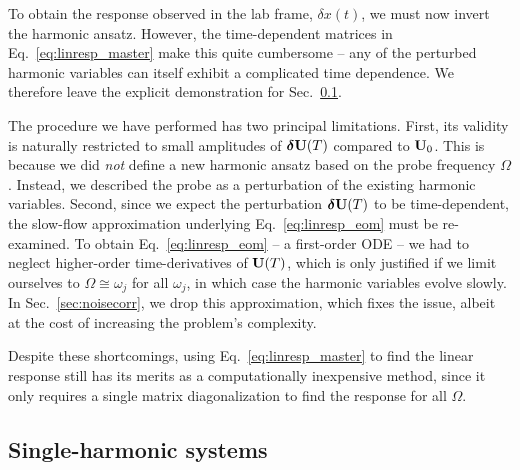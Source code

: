 To obtain the response observed in the lab frame, $\delta x(t)$, we must now invert the harmonic ansatz. However, the time-dependent matrices in Eq.~\eqref{eq:linresp_master} make this quite cumbersome -- any of the perturbed harmonic variables can itself exhibit a complicated time dependence. We therefore leave the explicit demonstration for Sec.~\ref{sec:single_harmonic}.

The procedure we have performed has two principal limitations. First, its validity is naturally restricted to small amplitudes of $\boldsymbol{\delta} \vb{U}(T)$ compared to $\vb{U}_0$. This is because we did \textit{not} define a new harmonic ansatz based on the probe frequency $\Omega$. Instead, we described the probe as a perturbation of the existing harmonic variables. Second, since we expect the perturbation $\boldsymbol{\delta} \vb{U}(T)$ to be time-dependent, the slow-flow approximation underlying Eq.~\eqref{eq:linresp_eom} must be re-examined. To obtain Eq.~\eqref{eq:linresp_eom} -- a first-order ODE -- we had to neglect higher-order time-derivatives of $\vb{U}(T)$, which is only justified if we limit ourselves to $\Omega \cong \omega_j$ for all $\omega_j$, in which case the harmonic variables evolve slowly. In Sec.~\ref{sec:noisecorr}, we drop this approximation, which fixes the issue, albeit at the cost of increasing the problem's complexity.

Despite these shortcomings, using Eq.~\eqref{eq:linresp_master} to find the linear response still has its merits as a computationally inexpensive method, since it only requires a single matrix diagonalization to find the response for all $\Omega$.

\subsection{Single-harmonic systems} \label{sec:single_harmonic}

